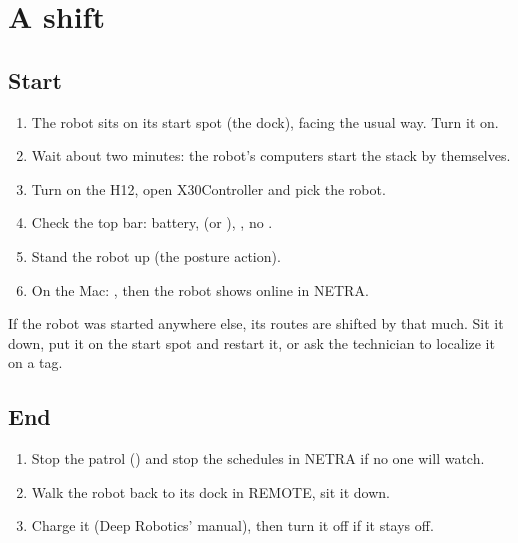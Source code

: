 \chapter{A shift}
\label{ch:u-shift}

\section{Start}

\begin{enumerate}
  \item The robot sits on its start spot (the dock), facing the usual way. Turn it on.
  \item Wait about two minutes: the robot's computers start the stack by themselves.
  \item Turn on the H12, open X30Controller and pick the robot.
  \item Check the top bar: battery,  (or ), , no
    .
  \item Stand the robot up (the posture action).
  \item On the Mac: , then the robot shows online in NETRA.
\end{enumerate}

\begin{warnbox}
If the robot was started anywhere else, its routes are shifted by that much. Sit it down, put it
on the start spot and restart it, or ask the technician to localize it on a tag.
\end{warnbox}

\section{End}

\begin{enumerate}
  \item Stop the patrol () and stop the schedules in NETRA if no one will watch.
  \item Walk the robot back to its dock in REMOTE, sit it down.
  \item Charge it (Deep Robotics' manual), then turn it off if it stays off.
\end{enumerate}
